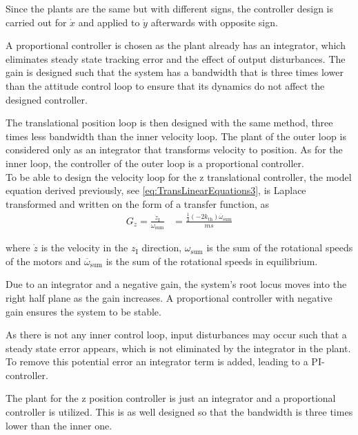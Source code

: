 Since the plants are the same but with different signs, the controller design is carried out for $\dot{x}$ and applied to $\dot{y}$ afterwards with opposite sign.

A proportional controller is chosen as the plant already has an integrator, which eliminates steady state tracking error and the effect of output disturbances. The gain is designed such that the system has a bandwidth that is three times lower than the attitude control loop to ensure that its dynamics do not affect the designed controller. %

The translational position loop is then designed with the same method, three times less bandwidth than the inner velocity loop. The plant of the outer loop is considered only as an integrator that transforms velocity to position. As for the inner loop, the controller of the outer loop is a proportional controller. \\

To be able to design the velocity loop for the z translational controller, the model equation derived previously, see \eqref{eq:TransLinearEquations3}, is Laplace transformed and written on the form of a transfer function, as
%
\vspace{-.1cm}
\begin{align}
G_{\dot{z}}=\frac{\dot{z}_{\mathrm{I}}}{\omega_{\mathrm{sum}}} &= \frac{ \frac{1}{4}(-2 k_{\mathrm{th}})\overline{\omega}_{\mathrm{sum}} }{ m s }\label{eq:linearTransferFunctionZ}
\end{align}

\noindent where $\dot{z}$ is the velocity in the $z_{\mathrm{I}}$ direction, $\omega_{\mathrm{sum}}$ is the sum of the rotational speeds of the motors and $\overline{\omega}_{\mathrm{sum}}$ is the sum of the rotational speeds in equilibrium.

Due to an integrator and a negative gain, the system's root locus moves into the right half plane as the gain increases. A proportional controller with negative gain ensures the system to be stable. 

As there is not any inner control loop, input disturbances may occur such that a steady state error appears, which is not eliminated by the integrator in the plant. To remove this potential error an integrator term is added, leading to a PI-controller. 

The plant for the z position controller is just an integrator and a proportional controller is utilized. This is as well designed so that the bandwidth is three times lower than the inner one.
